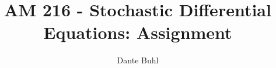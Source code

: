 \documentclass{article}
\begin{document}
\title{AM 216 - Stochastic Differential Equations: Assignment }
\author{Dante Buhl}


\newcommand{\wrms}{w_{\text{rms}}}
\newcommand{\bs}[1]{\boldsymbol{#1}}
\newcommand{\tb}[1]{\textbf{#1}}
\newcommand{\bmp}[1]{\begin{minipage}{#1\textwidth}}
\newcommand{\emp}{\end{minipage}}
\newcommand{\R}{\mathbb{R}}
\newcommand{\C}{\mathbb{C}}
\newcommand{\N}{\mathcal{N}}
\newcommand{\m}{\bs{\mu}_*}
\newcommand{\s}{\bs{\Sigma}_*}
\newcommand{\dt}{\Delta t}
\newcommand{\dx}{\Delta x}
\newcommand{\tr}[1]{\text{Tr}(#1)}
\newcommand{\Tr}[1]{\text{Tr}(#1)}
\newcommand{\Div}{\nabla \cdot}
\renewcommand{\div}{\nabla \cdot}
\newcommand{\Curl}{\nabla \times}
\newcommand{\Grad}{\nabla}
\newcommand{\grad}{\nabla}
\newcommand{\grads}{\nabla_s}
\newcommand{\gradf}{\nabla_f}
\newcommand{\xs}{x_s}
\newcommand{\x}{\bs{x}}
\newcommand{\xf}{x_f}
\newcommand{\ts}{t_s}
\newcommand{\tf}{t_f}
\newcommand{\pt}{\partial t}
\newcommand{\pz}{\partial z}
\newcommand{\uvec}{\bs{u}}
\newcommand{\bvec}{\bs{B}}
\newcommand{\nvec}{\hat{\bs{n}}}
\newcommand{\tu}{\tilde{\uvec}}
\newcommand{\B}{\bs{B}}
\newcommand{\A}{\bs{A}}
\newcommand{\jvec}{\bs{j}}
\newcommand{\F}{\bs{F}}
\newcommand{\T}{\tilde{T}}
\newcommand{\ez}{\bs{e}_z}
\newcommand{\ex}{\bs{e}_x}
\newcommand{\ey}{\bs{e}_y}
\newcommand{\eo}{\bs{e}_{\bs{\Omega}}}
\newcommand{\ppt}[1]{\frac{\partial #1}{\partial t}}
\newcommand{\pp}[2]{\frac{\partial #1}{\partial #2}}
\newcommand{\pptwo}[2]{\frac{\partial^2 #1}{\partial #2^2}}
\newcommand{\ddtwo}[2]{\frac{d^2 #1}{d #2^2}}
\newcommand{\DDt}[1]{\frac{D #1}{D t}}
\newcommand{\ppts}[1]{\frac{\partial #1}{\partial t_s}}
\newcommand{\pptf}[1]{\frac{\partial #1}{\partial t_f}}
\newcommand{\ppz}[1]{\frac{\partial #1}{\partial z}}
\newcommand{\ddz}[1]{\frac{d #1}{d z}}
\newcommand{\ppzetas}[1]{\frac{\partial^2 #1}{\partial \zeta^2}}
\newcommand{\ppzs}[1]{\frac{\partial #1}{\partial z_s}}
\newcommand{\ppzf}[1]{\frac{\partial #1}{\partial z_f}}
\newcommand{\ppx}[1]{\frac{\partial #1}{\partial x}}
\newcommand{\ddx}[1]{\frac{d #1}{d x}}
\newcommand{\ppxi}[1]{\frac{\partial #1}{\partial x_i}}
\newcommand{\ppxj}[1]{\frac{\partial #1}{\partial x_j}}
\newcommand{\ppy}[1]{\frac{\partial #1}{\partial y}}
\newcommand{\ppzeta}[1]{\frac{\partial #1}{\partial \zeta}}
\renewcommand{\k}{\bs{k}}
\newcommand{\real}[1]{\text{Re}\left[#1\right]}


\maketitle 
\setlength{\parindent}{0pt}
\end{document}
